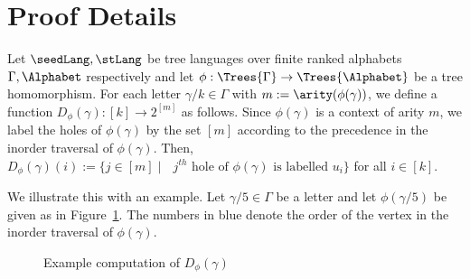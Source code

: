
\section{Proof Details}\label{sec:proofDetails}

\begin{definition}\label{def:destinationFunction}
  Let $\seedLang, \stLang$ be tree languages over finite ranked alphabets $\Gamma, \Alphabet$ respectively and let $\phi : \Trees{\Gamma} \to \Trees{\Alphabet}$ be a tree homomorphism. For each letter $\gamma/k \in \Gamma$ with $m := \arity(\phi(\gamma))$, we define a function $D_{\phi}(\gamma) : [k] \to 2^{[m]}$ as follows. Since $\phi(\gamma)$ is a context of arity $m$, we label the holes of $\phi(\gamma)$ by the set $[m]$ according to the precedence in the inorder traversal of $\phi(\gamma)$. Then, $D_{\phi}(\gamma)(i) := \{j \in [m] \mid \mbox{ $j^{th}$ hole of $\phi(\gamma)$ is labelled $u_i$}\}$ for all $i \in [k]$. 
\end{definition}

We illustrate this with an example. Let $\gamma/5 \in \Gamma$ be a letter and let $\phi(\gamma/5)$ be given as in Figure~\ref{fig:destinationFunctionExample}. The numbers in blue denote the order of the vertex in the inorder traversal of $\phi(\gamma)$.

\begin{figure}
\caption{Example computation of $D_{\phi}(\gamma)$}\label{fig:destinationFunctionExample}
\end{figure}

